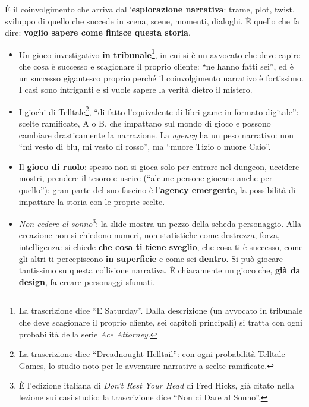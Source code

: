 È il coinvolgimento che arriva dall'\textbf{esplorazione narrativa}: trame, plot,
twist, sviluppo di quello che succede in scena, scene, momenti, dialoghi. È
quello che fa dire: \textbf{voglio sapere come finisce questa storia}.
\begin{itemize}
  \item Un gioco investigativo \textbf{in tribunale}\footnote{La trascrizione
        dice ``E Saturday''. Dalla descrizione (un avvocato in tribunale che
        deve scagionare il proprio cliente, sei capitoli principali) si tratta
        con ogni probabilità della serie \emph{Ace Attorney}.}, in cui si è un
        avvocato che deve capire che cosa è successo e scagionare il proprio
        cliente: ``ne hanno fatti sei'', ed è un successo gigantesco proprio
        perché il coinvolgimento narrativo è fortissimo. I casi sono intriganti
        e si vuole sapere la verità dietro il mistero.
  \item I giochi di Telltale\footnote{La trascrizione dice ``Dreadnought
        Helltail'': con ogni probabilità Telltale Games, lo studio noto per le
        avventure narrative a scelte ramificate.}, ``di fatto l'equivalente di
        libri game in formato digitale'': scelte ramificate, A o B, che
        impattano sul mondo di gioco e possono cambiare drasticamente la
        narrazione. La \emph{agency} ha un peso narrativo: non ``mi vesto di
        blu, mi vesto di rosso'', ma ``muore Tizio o muore Caio''.
  \item Il \textbf{gioco di ruolo}: spesso non si gioca solo per entrare nel
        dungeon, uccidere mostri, prendere il tesoro e uscire (``alcune persone
        giocano anche per quello''): gran parte del suo fascino è
        l'\textbf{agency emergente}, la possibilità di impattare la storia con
        le proprie scelte.
  \item \emph{Non cedere al sonno}\footnote{È l'edizione italiana di \emph{Don't
        Rest Your Head} di Fred Hicks, già citato nella lezione sui casi
        studio; la trascrizione dice ``Non ci Dare al Sonno''.}: la slide mostra
        un pezzo della scheda personaggio. Alla creazione non si chiedono
        numeri, non statistiche come destrezza, forza, intelligenza: si chiede
        \textbf{che cosa ti tiene sveglio}, che cosa ti è successo, come gli
        altri ti percepiscono \textbf{in superficie} e come sei
        \textbf{dentro}. Si può giocare tantissimo su questa collisione
        narrativa. È chiaramente un gioco che, \textbf{già da design}, fa creare
        personaggi sfumati.
\end{itemize}

